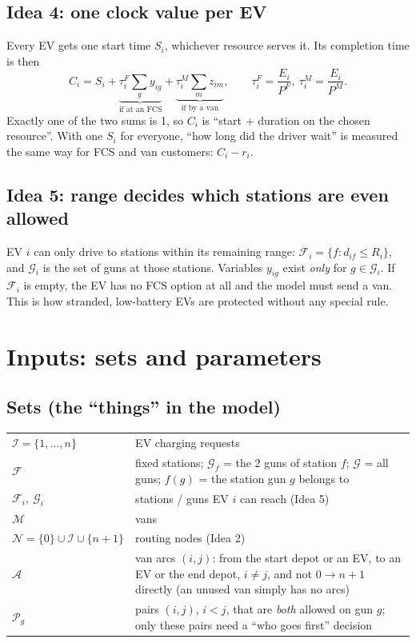 \documentclass[11pt,a4paper]{article}
\newcommand{\I}{\mathcal{I}}
\newcommand{\F}{\mathcal{F}}
\newcommand{\G}{\mathcal{G}}
\newcommand{\M}{\mathcal{M}}
\newcommand{\N}{\mathcal{N}}
\newcommand{\A}{\mathcal{A}}
\begin{document}
\subsection*{Idea 4: one clock value per EV}
Every EV gets one start time $S_i$, whichever resource serves it. Its completion time is then
\[
C_i = S_i + \underbrace{\tau^F_i\textstyle\sum_g y_{ig}}_{\text{if at an FCS}} + \underbrace{\tau^M_i\textstyle\sum_m z_{im}}_{\text{if by a van}}, \qquad \tau^F_i=\frac{E_i}{P^F},\ \tau^M_i=\frac{E_i}{P^M}.
\]
Exactly one of the two sums is 1, so $C_i$ is ``start + duration on the chosen resource''. With one $S_i$ for everyone, ``how long did the driver wait'' is measured the same way for FCS and van customers: $C_i-r_i$.

\subsection*{Idea 5: range decides which stations are even allowed}
EV $i$ can only drive to stations within its remaining range: $\F_i=\{f: d_{if}\le R_i\}$, and $\G_i$ is the set of guns at those stations. Variables $y_{ig}$ exist \emph{only} for $g\in\G_i$. If $\F_i$ is empty, the EV has no FCS option at all and the model must send a van. This is how stranded, low-battery EVs are protected without any special rule.

\section{Inputs: sets and parameters}\label{sec:inputs}

\subsection{Sets (the ``things'' in the model)}
\begin{tabularx}{\textwidth}{@{}lX@{}}
\toprule
$\I=\{1,\dots,n\}$ & EV charging requests \\
$\F$ & fixed stations; $\G_f$ = the 2 guns of station $f$; $\G$ = all guns; $f(g)$ = the station gun $g$ belongs to \\
$\F_i,\ \G_i$ & stations / guns EV $i$ can reach (Idea 5) \\
$\M$ & vans \\
$\N=\{0\}\cup\I\cup\{n+1\}$ & routing nodes (Idea 2) \\
$\A$ & van arcs $(i,j)$: from the start depot or an EV, to an EV or the end depot, $i\ne j$, and not $0\to n+1$ directly (an unused van simply has no arcs) \\
$\mathcal{P}_g$ & pairs $(i,j)$, $i<j$, that are \emph{both} allowed on gun $g$; only these pairs need a ``who goes first'' decision \\
\bottomrule
\end{tabularx}
\end{document}
